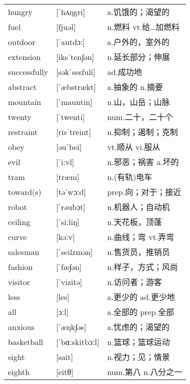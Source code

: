\documentclass[a4paper]{article}
\begin{document}
\section{}
\begin{tabular}{l l l}

hungry & [ˈhʌŋgri] & a.饥饿的；渴望的 \\
fuel & [fjuəl] & n.燃料 vt.给…加燃料 \\
outdoor & [ˈautdɔː] & a.户外的，室外的 \\
extension & [iksˈten∫ən] & n.延长部分；伸展 \\
successfully & [səkˈsesfuli] & ad.成功地 \\
abstract & [ˈæbstrækt] & a.抽象的 n.摘要 \\
mountain & [ˈmauntin] & n.山，山岳；山脉 \\
twenty & [ˈtwenti] & num.二十，二十个 \\
restraint & [risˈtreint] & n.抑制；遏制；克制 \\
obey & [əuˈbei] & vt.顺从 vi.服从 \\
evil & [ˈiːvl] & n.邪恶；祸害 a.坏的 \\
tram & [træm] & n.(有轨)电车 \\
toward(s) & [təˈwɔːd] & prep.向；对于；接近 \\
robot & [ˈrəubɔt] & n.机器人；自动机 \\
ceiling & [ˈsiːliŋ] & n.天花板，顶蓬 \\
curve & [kəːv] & n.曲线；弯 vt.弄弯 \\
salesman & [ˈseilzmən] & n.售货员，推销员 \\
fashion & [ˈfæ∫ən] & n.样子，方式；风尚 \\
visitor & [ˈvizitə] & n.访问者；游客 \\
less & [les] & a.更少的 ad.更少地 \\
all & [ɔːl] & a.全部的 prep.全部 \\
anxious & [ˈæŋk∫əs] & a.忧虑的；渴望的 \\
basketball & [ˈbɑːskitbɔːl] & n.篮球；篮球运动 \\
sight & [sait] & n.视力；见；情景 \\
eighth & [eitθ] & num.第八 n.八分之一 \\

\end{tabular}
\end{document}
